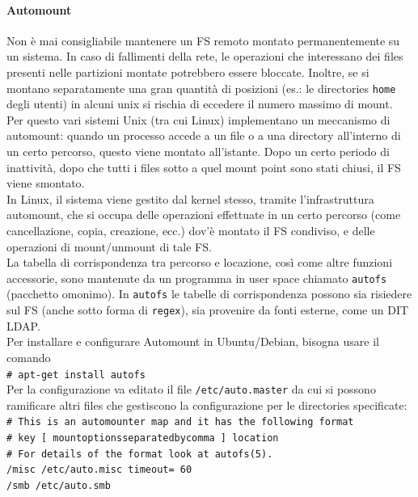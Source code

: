 \documentclass[a4paper]{report}
\newcommand\tab[1][1cm]{\hspace*{#1}}
\begin{document}
\paragraph{Automount} Non è mai consigliabile mantenere un FS remoto montato permanentemente su un sistema. In caso di fallimenti della rete, le operazioni che interessano dei files presenti nelle partizioni montate potrebbero essere bloccate. Inoltre, se si montano separatamente una gran quantità di posizioni (es.: le directories \texttt{home} degli utenti) in alcuni unix si rischia di eccedere il numero massimo di mount.\\
Per questo vari sistemi Unix (tra cui Linux) implementano un meccanismo di automount: quando un processo accede a un file o a una directory all'interno di un certo percorso, questo viene montato all'istante. Dopo un certo periodo di inattività, dopo che tutti i files sotto a quel mount point sono stati chiusi, il FS viene smontato.\\
In Linux, il sistema viene gestito dal kernel stesso, tramite l'infrastruttura automount, che si occupa delle operazioni effettuate in un certo percorso (come cancellazione, copia, creazione, ecc.) dov'è montato il FS condiviso, e delle operazioni di mount/unmount di tale FS.\\
La tabella di corrispondenza tra percorso e locazione, così come altre funzioni accessorie, sono mantenute da un programma in user space chiamato \texttt{autofs} (pacchetto omonimo). In \texttt{autofs} le tabelle di corrispondenza possono sia risiedere sul FS (anche sotto forma di \texttt{regex}), sia provenire da fonti esterne, come un DIT LDAP.\\
Per installare e configurare Automount in Ubuntu/Debian, bisogna usare il comando
\\\tab\texttt{\# apt-get install autofs}\\
Per la configurazione va editato il file \texttt{/etc/auto.master} da cui si possono ramificare altri files che gestiscono la configurazione per le directories specificate:\\
\tab\texttt{\# This is an automounter map and it has the following format}\\
\tab\texttt{\# key [ mountoptionsseparatedbycomma
] location}\\
\tab\texttt{\# For details of the format look at autofs(5).}\\
\tab\texttt{/misc /etc/auto.misc timeout=
60}\\
\tab\texttt{/smb /etc/auto.smb}\\
\end{document}
